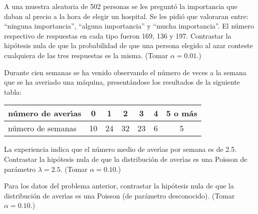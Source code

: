\begin{prob}%
    A una muestra aleatoria de 502 personas se les pregunt\'{o} la
    im\-por\-tan\-cia que daban al precio a la hora de elegir un hospital.
    Se les pidi\'{o} que valoraran entre: ``ninguna importancia'', ``alguna
    importancia'' y ``mucha importancia''. El n\'{u}mero respectivo de
    respuestas en cada tipo fueron 169, 136 y 197. Contrastar la
    hip\'{o}tesis nula de que la probabilidad de que una persona elegido al
    azar conteste cualquiera de las tres respuestas es la misma. (Tomar
    $\alpha = 0.01$.)
\end{prob}

\begin{prob}%
    Durante cien semanas se ha venido observando el n\'{u}mero de veces a la
    semana que se ha averiado una m\'{a}quina, present\'{a}ndose los
    resultados de la siguiente tabla:
    \begin{center}
        \begin{tabular}{|l|cccccc|}
            \hline
            n\'{u}mero de aver\'{\i}as & 0  & 1  & 2  & 3  & 4
            & 5 o m\'{a}s    \\
            \hline
            n\'{u}mero de semanas      & 10 & 24 & 32 & 23 & 6
           & 5               \\
            \hline
            \end{tabular}
    \end{center}
    La experiencia indica que el n\'umero medio de aver\'{\i}as por
    semana es de 2.5. Contrastar la hip\'{o}tesis nula de que la
    distribuci\'{o}n de aver\'{\i}as es una Poisson de par\'ametro
    $\lambda = 2.5$. (Tomar $\alpha = 0.10$.)
\end{prob}

\begin{prob}%
    Para los datos del problema anterior, contrastar la hip\'{o}tesis
    nula de que la distribuci\'{o}n de aver\'{\i}as es una Poisson (de
    par\'ametro desconocido). (Tomar $\alpha = 0.10$.)
\end{prob}

